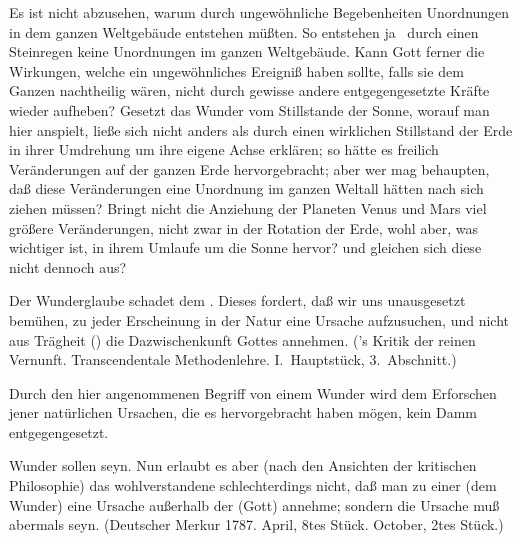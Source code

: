  Es ist nicht abzusehen, warum durch ungewöhnliche Begebenheiten Unordnungen in dem ganzen Weltgebäude entstehen müßten. So entstehen ja \zB\ durch einen Steinregen keine Unordnungen im ganzen Weltgebäude. Kann Gott ferner die Wirkungen, welche ein ungewöhnliches Ereigniß haben sollte, falls sie dem Ganzen nachtheilig wären, nicht durch gewisse andere entgegengesetzte Kräfte wieder aufheben? Gesetzt das Wunder vom Stillstande der Sonne, worauf man hier anspielt, ließe sich nicht anders als durch einen wirklichen Stillstand der Erde in ihrer Umdrehung um ihre eigene Achse erklären; so hätte es freilich Veränderungen auf der ganzen Erde hervorgebracht; aber wer mag behaupten, daß diese Veränderungen eine Unordnung im ganzen Weltall hätten nach sich ziehen müssen? Bringt nicht die Anziehung der Planeten Venus und Mars viel größere Veränderungen, nicht zwar in der Rotation der Erde, wohl aber, was wichtiger ist, in ihrem Umlaufe um die Sonne hervor? und gleichen sich diese nicht dennoch aus?\par
{} Der Wunderglaube schadet dem . Dieses fordert, daß wir uns unausgesetzt bemühen, zu jeder Erscheinung in der Natur eine Ursache aufzusuchen, und nicht aus Trägheit () die Dazwischenkunft Gottes annehmen. ('s Kritik der reinen Vernunft. Transcendentale Methodenlehre. I.~Hauptstück, 3.~Abschnitt.)\par
{} Durch den hier angenommenen Begriff von einem Wunder wird dem Erforschen jener natürlichen Ursachen, die es hervorgebracht haben mögen, kein Damm entgegengesetzt.\par
{} Wunder sollen  seyn. Nun erlaubt es aber (nach den Ansichten der kritischen Philosophie) das wohlverstandene  schlechterdings nicht, daß man zu einer  (dem Wunder) eine Ursache außerhalb der  (Gott) annehme; sondern die Ursache muß abermals  seyn. (Deutscher Merkur 1787. April, 8tes Stück. October, 2tes Stück.)~\par
